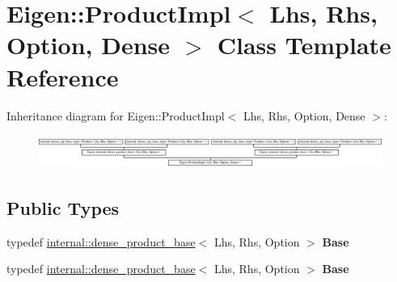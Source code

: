 \hypertarget{class_eigen_1_1_product_impl_3_01_lhs_00_01_rhs_00_01_option_00_01_dense_01_4}{}\section{Eigen\+:\+:Product\+Impl$<$ Lhs, Rhs, Option, Dense $>$ Class Template Reference}
\label{class_eigen_1_1_product_impl_3_01_lhs_00_01_rhs_00_01_option_00_01_dense_01_4}
Inheritance diagram for Eigen\+:\+:Product\+Impl$<$ Lhs, Rhs, Option, Dense $>$\+:\begin{figure}[H]
\begin{center}
\leavevmode
\includegraphics[height=1.108179cm]{class_eigen_1_1_product_impl_3_01_lhs_00_01_rhs_00_01_option_00_01_dense_01_4}
\end{center}
\end{figure}
\subsection*{Public Types}
\begin{DoxyCompactItemize}
\item 
\mbox{\label{class_eigen_1_1_product_impl_3_01_lhs_00_01_rhs_00_01_option_00_01_dense_01_4_ab67d2631482379025bfbf302f46f1b78}} 
typedef \hyperlink{class_eigen_1_1internal_1_1dense__product__base}{internal\+::dense\+\_\+product\+\_\+base}$<$ Lhs, Rhs, Option $>$ {\bfseries Base}
\item 
\mbox{\label{class_eigen_1_1_product_impl_3_01_lhs_00_01_rhs_00_01_option_00_01_dense_01_4_ab67d2631482379025bfbf302f46f1b78}} 
typedef \hyperlink{class_eigen_1_1internal_1_1dense__product__base}{internal\+::dense\+\_\+product\+\_\+base}$<$ Lhs, Rhs, Option $>$ {\bfseries Base}
\end{DoxyCompactItemize}
